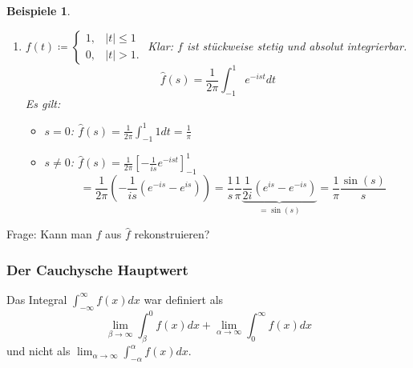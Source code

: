 \documentclass[12pt]{extreport} %
\newcommand{\R}{\mathbb{R}}
\theoremstyle{named}
\theoremstyle{nnamed}
\theoremstyle{itshape}
\theoremstyle{normal}
\newtheorem*{beispiele}{Beispiele}
\begin{document}
\begin{beispiele}
\begin{enumerate}
			Beispiel a) $\Rightarrow f$ ist auf $\R$ absolut integrierbar. Klar: $f$ ist auf $\R$ stückweise stetig.
				$$ \xRightarrow[]{a)} \int_{0}^{\infty} e^{-t} e^{-ist} dt = \frac{1}{1 + is} \Rightarrow \hat{f}(s) = \frac{1}{\pi} \frac{1}{1 + s^{2}} $$
			Analog sieht man: 
				$$ \int^{0}_{-\infty} e^{t} e^{-ist} dt = \frac{1}{1 - is}. $$
			Also:
			  \begin{align*}
				\hat{f}(s) & = \frac{1}{2\pi} \left( \int^{0}_{-\infty} e^{t} e^{-ist} dt + \int_{0}^{\infty} e^{-t} e^{-ist} dt \right) \\
						& = \frac{1}{2\pi} \left( \frac{1}{1 - is} + \frac{1}{1 +is} \right)  \\ 
						& = \frac{1}{2\pi} \left( \frac{1+is + 1 - is}{1+s^{2}} \right) \\
						& = \frac{1}{\pi} \frac{1}{1 + s^{2}}
			  \end{align*}
		\item $f(t) \coloneqq \begin{cases} 1, & |t| \leq 1 \\ 0, & |t| > 1. \end{cases}$ Klar: $f$ ist stückweise stetig und absolut integrierbar. %
			$$ \hat{f}(s) = \frac{1}{2\pi} \int_{-1}^{1} e^{-ist} dt $$
			Es gilt:
			\begin{itemize}
				\item $s = 0$: $\hat{f}(s) = \frac{1}{2\pi} \int_{-1}^{1} 1 dt = \frac{1}{\pi}$
				\item $s \neq 0$: $\hat{f}(s) = \frac{1}{2 \pi} \left[ - \frac{1}{is} e^{-ist} \right]_{-1}^{1}$
			 	 $$ \quad  = \frac{1}{2\pi} \left( -\frac{1}{is} \left( e^{-is} - e^{is} \right) \right)  = \frac{1}{s} \frac{1}{\pi} \underbrace{\frac{1}{2i} \left( e^{is} - e^{-is} \right)}_{= \sin(s)}  = \frac{1}{\pi} \frac{\sin(s)}{s} $$
			\end{itemize}
		\end{enumerate}
\end{beispiele}

Frage: Kann man $f$ aus $\hat{f}$ rekonstruieren?

\subsubsection*{Der Cauchysche Hauptwert}

Das Integral $\int_{-\infty}^{\infty} f(x) dx$ war definiert als 
	$$ \lim_{\beta \rightarrow \infty} \int_{\beta}^{0} f(x) dx + \lim_{\alpha \rightarrow \infty} \int_{0}^{\infty} f(x) dx $$
und nicht als $\lim_{\alpha \rightarrow \infty} \int_{-\alpha}^{\alpha} f(x) dx.$
\end{document}
